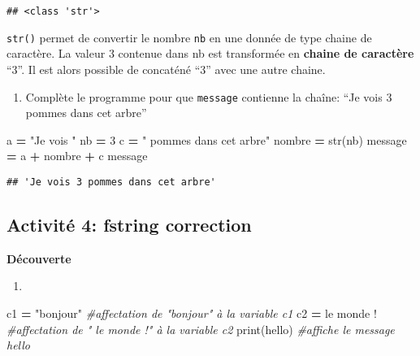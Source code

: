 \documentclass[
]{book}
\newenvironment{Shaded}{\begin{snugshade}}{\end{snugshade}}
\newcommand{\BuiltInTok}[1]{#1}
\newcommand{\CommentTok}[1]{\textcolor[rgb]{0.56,0.35,0.01}{\textit{#1}}}
\newcommand{\DecValTok}[1]{\textcolor[rgb]{0.00,0.00,0.81}{#1}}
\newcommand{\NormalTok}[1]{#1}
\newcommand{\OperatorTok}[1]{\textcolor[rgb]{0.81,0.36,0.00}{\textbf{#1}}}
\newcommand{\StringTok}[1]{\textcolor[rgb]{0.31,0.60,0.02}{#1}}
\providecommand{\tightlist}{%
  \setlength{\itemsep}{0pt}\setlength{\parskip}{0pt}}
\def\tightlist{}
\begin{document}
\begin{verbatim}
## <class 'str'>
\end{verbatim}

\texttt{str()} permet de convertir le nombre \texttt{nb} en une donnée de type chaine de caractère. La valeur 3 contenue dans nb est transformée en \textbf{chaine de caractère} ``3''. Il est alors possible de concaténé ``3'' avec une autre chaine.

\begin{enumerate}
\def\labelenumi{\arabic{enumi}.}
\setcounter{enumi}{5}
\tightlist
\item
  Complète le programme pour que \texttt{message} contienne la chaîne: ``Je vois 3 pommes dans cet arbre''
\end{enumerate}

\begin{Shaded}
\begin{Highlighting}[]
\NormalTok{a }\OperatorTok{=} \StringTok{"Je vois "}
\NormalTok{nb }\OperatorTok{=} \DecValTok{3}
\NormalTok{c }\OperatorTok{=} \StringTok{" pommes dans cet arbre"}
\NormalTok{nombre }\OperatorTok{=} \BuiltInTok{str}\NormalTok{(nb)}
\NormalTok{message }\OperatorTok{=}\NormalTok{ a }\OperatorTok{+}\NormalTok{ nombre }\OperatorTok{+}\NormalTok{ c}
\NormalTok{message}
\end{Highlighting}
\end{Shaded}

\begin{verbatim}
## 'Je vois 3 pommes dans cet arbre'
\end{verbatim}

\hypertarget{activituxe9-4-fstring-correction}{%
\subsection{Activité 4: fstring correction}\label{activituxe9-4-fstring-correction}}

\textbf{Découverte}

\begin{enumerate}
\def\labelenumi{\arabic{enumi}.}
\setcounter{enumi}{1}
\tightlist
\item
\end{enumerate}

\begin{Shaded}
\begin{Highlighting}[]
\NormalTok{c1 }\OperatorTok{=} \StringTok{"bonjour"} \CommentTok{\#affectation de "bonjour" à la variable c1}
\NormalTok{c2 }\OperatorTok{=} \StringTok{\textquotesingle{} le monde !\textquotesingle{}} \CommentTok{\#affectation de " le monde !" à la variable c2}
\BuiltInTok{print}\NormalTok{(}\StringTok{\textquotesingle{}hello\textquotesingle{}}\NormalTok{) }\CommentTok{\#affiche le message hello}
\end{Highlighting}
\end{Shaded}
\end{document}

